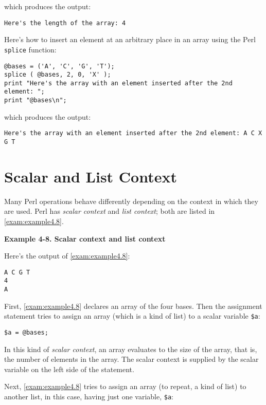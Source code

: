 which produces the output:

\begin{lstlisting}
Here's the length of the array: 4
\end{lstlisting}

Here's how to insert an element at an arbitrary place in an array using the Perl \verb|splice| function: 

\begin{lstlisting}
@bases = ('A', 'C', 'G', 'T');
splice ( @bases, 2, 0, 'X' );
print "Here's the array with an element inserted after the 2nd element: ";
print "@bases\n";
\end{lstlisting}

which produces the output:

\begin{lstlisting}
Here's the array with an element inserted after the 2nd element: A C X G T
\end{lstlisting}

\section{Scalar and List Context}
Many Perl operations behave differently depending on the context in which they are used. Perl has \textit{scalar context} and \textit{list context}; both are listed in \autoref{exam:example4.8}.

\textbf{Example 4-8. Scalar context and list context}



Here's the output of \autoref{exam:example4.8}:

\begin{lstlisting}
A C G T
4
A
\end{lstlisting}

First, \autoref{exam:example4.8} declares an array of the four bases. Then the assignment statement tries to assign an array (which is a kind of list) to a scalar variable \verb|$a|: 

\begin{lstlisting}
$a = @bases;
\end{lstlisting}

In this kind of \textit{scalar context}, an array evaluates to the size of the array, that is, the number of elements in the array. The scalar context is supplied by the scalar variable on the left side of the statement.

Next, \autoref{exam:example4.8} tries to assign an array (to repeat, a kind of list) to another list, in this case, having just one variable, \verb|$a|:

